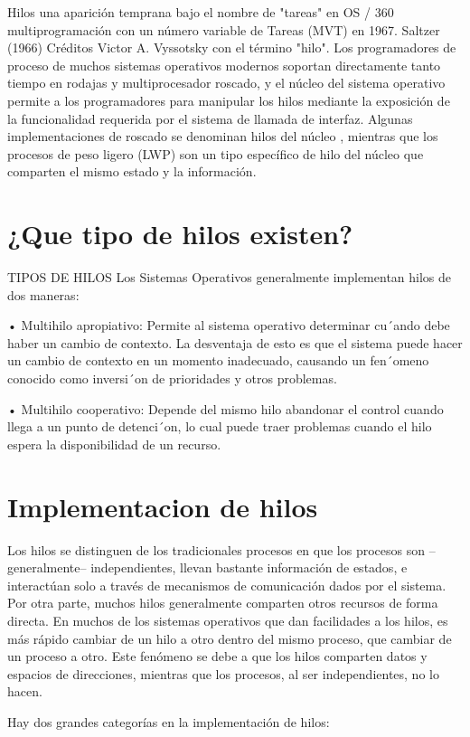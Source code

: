 \documentclass{article}
\begin{document}
Hilos una aparición temprana bajo el nombre de "tareas" en OS / 360 multiprogramación con un número variable de Tareas (MVT) en 1967. Saltzer (1966) Créditos Victor A. Vyssotsky con el término "hilo". Los programadores de proceso de muchos sistemas operativos modernos soportan directamente tanto tiempo en rodajas y multiprocesador roscado, y el núcleo del sistema operativo permite a los programadores para manipular los hilos mediante la exposición de la funcionalidad requerida por el sistema de llamada de interfaz. Algunas implementaciones de roscado se denominan hilos del núcleo , mientras que los procesos de peso ligero (LWP) son un tipo específico de hilo del núcleo que comparten el mismo estado y la información. 

\vspace{5mm}
\section{¿Que tipo de hilos existen?}
\par
TIPOS DE HILOS
Los Sistemas Operativos generalmente implementan hilos de
dos maneras:
\par
• Multihilo apropiativo: Permite al sistema operativo
determinar cu´ando debe haber un cambio de contexto. La
desventaja de esto es que el sistema puede hacer un cambio de
contexto en un momento inadecuado, causando un fen´omeno
conocido como inversi´on de prioridades y otros problemas.
\par
• Multihilo cooperativo: Depende del mismo hilo abandonar
el control cuando llega a un punto de detenci´on, lo cual
puede traer problemas cuando el hilo espera la disponibilidad
de un recurso.

\vspace{5mm}

\section{Implementacion de hilos}
\par
Los hilos se distinguen de los tradicionales procesos en que los procesos son –generalmente– independientes, llevan bastante información de estados, e interactúan solo a través de mecanismos de comunicación dados por el sistema. Por otra parte, muchos hilos generalmente comparten otros recursos de forma directa. En muchos de los sistemas operativos que dan facilidades a los hilos, es más rápido cambiar de un hilo a otro dentro del mismo proceso, que cambiar de un proceso a otro. Este fenómeno se debe a que los hilos comparten datos y espacios de direcciones, mientras que los procesos, al ser independientes, no lo hacen.
\par
Hay dos grandes categorías en la implementación de hilos:
\end{document}
